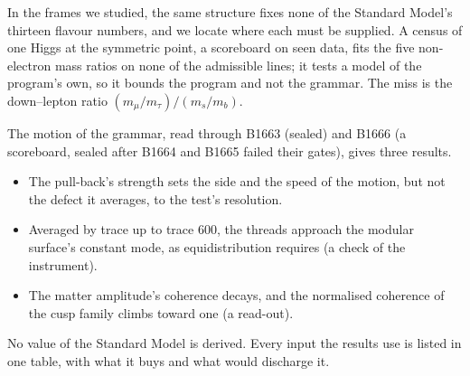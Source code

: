 In the frames we studied, the same structure fixes none of the Standard Model's thirteen flavour numbers, and we locate where each must be
supplied. A census of one Higgs at the symmetric point, a scoreboard on seen data, fits the five non-electron mass ratios
on none of the admissible lines; it tests a model of the program's own, so it bounds the program and not the grammar. The miss is the down--lepton ratio $(m_\mu/m_\tau)/(m_s/m_b)$.

The motion of the grammar, read through B1663 (sealed) and B1666 (a scoreboard, sealed after B1664 and B1665 failed their
gates), gives three results.
\begin{itemize}
\item The pull-back's strength sets the side and the speed of the motion, but not the defect it averages, to the test's
  resolution.
\item Averaged by trace up to trace $600$, the threads approach the modular surface's constant mode, as equidistribution requires (a check of the
  instrument).
\item The matter amplitude's coherence decays, and the normalised coherence of the cusp family climbs toward one (a read-out).
\end{itemize}

No value of the Standard Model is derived. Every input the results use is listed in one table, with what it buys and what would discharge it.

